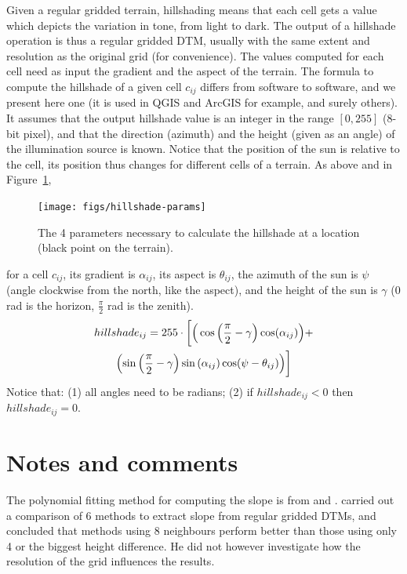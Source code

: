 Given a regular gridded terrain, hillshading means that each cell gets a value which depicts the variation in tone, from light to dark.
The output of a hillshade operation is thus a regular gridded DTM, usually with the same extent and resolution as the original grid (for convenience).
The values computed for each cell need as input the gradient and the aspect of the terrain\@.
The formula to compute the hillshade of a given cell $c_{ij}$ differs from software to software, and we present here one (it is used in QGIS and ArcGIS for example, and surely others).
It assumes that the output hillshade value is an integer in the range $[0,255]$ (8-bit pixel), and that the direction (azimuth) and the height (given as an angle) of the illumination source is known.
Notice that the position of the sun is relative to the cell, its position thus changes for different cells of a terrain\@.
As above and in Figure~\ref{fig:hillshade-params}, 
\begin{figure}
  \centering
  \texttt{[image: figs/hillshade-params]}
  \caption{The 4 parameters necessary to calculate the hillshade at a location (black point on the terrain).}%
\label{fig:hillshade-params}
\end{figure}
for a cell $c_{ij}$, its gradient is $\alpha_{ij}$, its aspect is $\theta_{ij}$, the azimuth of the sun is $\psi$ (angle clockwise from the north, like the aspect), and the height of the sun is $\gamma$ (0 rad is the horizon, $\frac{\pi}{2}$ rad is the zenith).
\begin{multline}  
  hillshade_{ij} = 255 \cdot \biggl[ \Big( \cos\left(\frac{\pi}{2} - \gamma\right) \cos(\alpha_{ij}) \Big) + \\
                         \Bigl( \sin\left(\frac{\pi}{2} - \gamma\right) \sin\left(\alpha_{ij}\right) \cos(\psi - \theta_{ij}) \Bigr) \biggr]
\end{multline}
Notice that: (1) all angles need to be radians; (2) if $hillshade_{ij} < 0$ then $hillshade_{ij} = 0$.


%
\section{Notes and comments}

The polynomial fitting method for computing the slope is from \citet{Evans80} and \citet{Wood96}.
\citet{Skidmore89} carried out a comparison of 6 methods to extract slope from regular gridded DTMs, and concluded that methods using 8 neighbours perform better than those using only 4 or the biggest height difference.
He did not however investigate how the resolution of the grid influences the results.

